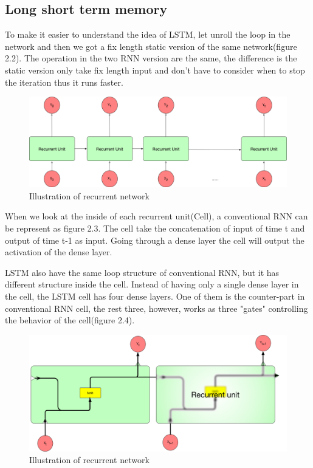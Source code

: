 \subsection{Long short term memory}
To make it easier to understand the idea of LSTM, let unroll the loop in the network and then we got a fix length static version of the same network(figure 2.2). The operation in the two RNN version are the same, the difference is the static version only take fix length input and don't have to consider when to stop the iteration thus it runs faster.\par
\begin{figure}[h] 
	\centering
	\includegraphics[width=6.0in]{Figures/recurrent2}
	\caption[Box figure]{Illustration of recurrent network}
\end{figure}

When we look at the inside of each recurrent unit(Cell), a conventional RNN can be represent as figure 2.3. The cell take the concatenation of input of time t and output of time t-1 as input. Going through a dense layer the cell will output the activation of the dense layer.\par  

LSTM also have the same loop structure of conventional RNN, but it has different structure inside the cell. Instead of having only a single dense layer in the cell, the LSTM cell has four dense layers. One of them is the counter-part in conventional RNN cell, the rest three, however, works as three "gates" controlling the behavior of the cell(figure 2.4).\par 

\begin{figure}[h] 
	\centering
	\includegraphics[width=6.0in]{Figures/recurrent3}
	\caption[Box figure]{Illustration of recurrent network}
\end{figure}

